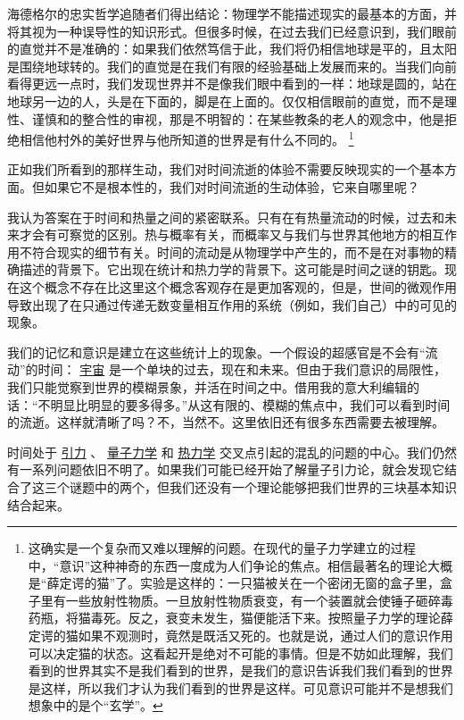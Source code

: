     海德格尔的忠实哲学追随者们得出结论：物理学不能描述现实的最基本的方面，并将其视为一种误导性的知识形式。但很多时候，在过去我们已经意识到，我们眼前的直觉并不是准确的：如果我们依然笃信于此，我们将仍相信地球是平的，且太阳是围绕地球转的。我们的直觉是在我们有限的经验基础上发展而来的。当我们向前看得更远一点时，我们发现世界并不是像我们眼中看到的一样：地球是圆的，站在地球另一边的人，头是在下面的，脚是在上面的。仅仅相信眼前的直觉，而不是理性、谨慎和的整合性的审视，那是不明智的：在某些教条的老人的观念中，他是拒绝相信他村外的美好世界与他所知道的世界是有什么不同的。
\footnote[5]
{
这确实是一个复杂而又难以理解的问题。在现代的量子力学建立的过程中，“意识”这种神奇的东西一度成为人们争论的焦点。相信最著名的理论大概是“薛定谔的猫”了。实验是这样的：一只猫被关在一个密闭无窗的盒子里，盒子里有一些放射性物质。一旦放射性物质衰变，有一个装置就会使锤子砸碎毒药瓶，将猫毒死。反之，衰变未发生，猫便能活下来。按照量子力学的理论薛定谔的猫如果不观测时，竟然是既活又死的。也就是说，通过人们的意识作用可以决定猫的状态。这看起开是绝对不可能的事情。但是不妨如此理解，我们看到的世界其实不是我们看到的世界，是我们的意识告诉我们我们看到的世界是这样，所以我们才认为我们看到的世界是这样。可见意识可能并不是想我们想象中的是个“玄学”。
}

 
   正如我们所看到的那样生动，我们对时间流逝的体验不需要反映现实的一个基本方面。但如果它不是根本性的，我们对时间流逝的生动体验，它来自哪里呢？
 
   我认为答案在于时间和热量之间的紧密联系。只有在有热量流动的时候，过去和未来才会有可察觉的区别。热与概率有关，而概率又与我们与世界其他地方的相互作用不符合现实的细节有关。时间的流动是从物理学中产生的，而不是在对事物的精确描述的背景下。它出现在统计和热力学的背景下。这可能是时间之谜的钥匙。现在这个概念不存在比这里这个概念客观存在是更加客观的，但是，世间的微观作用导致出现了在只通过传递无数变量相互作用的系统（例如，我们自己）中的可见的现象。

    我们的记忆和意识是建立在这些统计上的现象。一个假设的超感官是不会有“流动”的时间：
\href{http://toyhouse.cc/wiki/index.php/宇宙}{宇宙}
是一个单块的过去，现在和未来。但由于我们意识的局限性，我们只能觉察到世界的模糊景象，并活在时间之中。借用我的意大利编辑的话：“不明显比明显的要多得多。”从这有限的、模糊的焦点中，我们可以看到时间的流逝。这样就清晰了吗？不，当然不。这里依旧还有很多东西需要去被理解。

    时间处于
\href{http://toyhouse.cc/wiki/index.php/引力}{引力}
、
\href{http://toyhouse.cc/wiki/index.php/量子力学}{量子力学}
和
\href{http://toyhouse.cc/wiki/index.php/热力学}{热力学}
交叉点引起的混乱的问题的中心。我们仍然有一系列问题依旧不明了。如果我们可能已经开始了解量子引力论，就会发现它结合了这三个谜题中的两个，但我们还没有一个理论能够把我们世界的三块基本知识结合起来。

